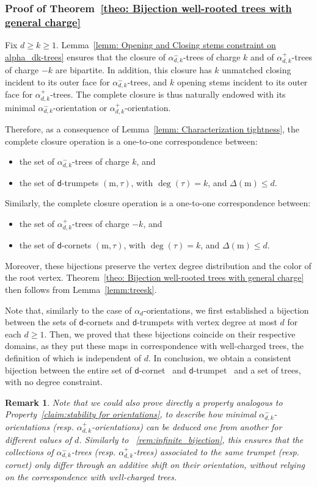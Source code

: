 \documentclass[11pt,reqno,tbtags]{amsart}
\renewcommand{\rm}{\mathrm{m}}
\newtheorem{rema}[theo]{Remark}
\numberwithin{equation}{section}
\numberwithin{theo}{section}
\theoremstyle{definition}
\newcommand{\dtrum}{$\mathsf{d}$-trumpet}
\newcommand{\dcorn}{$\mathsf{d}$-cornet}
\begin{document}
			
\subsubsection{Proof of Theorem~\ref{theo: Bijection well-rooted trees with general charge}}

Fix $d \geq k\geq 1$.
Lemma~\ref{lemm: Opening and Closing stems constraint on alpha_dk-trees} ensures that the closure of $\alpha_{d,k}^-$-trees of charge $k$ and of  $\alpha_{d,k}^+$-trees of charge $-k$  are bipartite. In addition, this closure has $k$ unmatched closing incident to its outer face for $\alpha_{d,k}^-$-trees, and $k$ opening stems incident to its outer face for $\alpha_{d,k}^+$-trees. The complete closure is thus naturally endowed with its minimal $\alpha_{d,k}^-$-orientation or $\alpha_{d,k}^+$-orientation. 


Therefore, as a consequence of Lemma~\ref{lemm: Characterization tightness}, the complete closure operation is a one-to-one correspondence between:
\begin{itemize}
\item the set of $\alpha_{d,k}^-$-trees of charge $k$, and
\item the set of \dtrum{s} $(\rm,\tau)$, with $\deg(\tau)=k$, and $\Delta(\rm)\leq d$.
\end{itemize}
Similarly, the complete closure operation is a one-to-one correspondence between:
\begin{itemize}
\item the set of $\alpha_{d,k}^+$-trees of charge $-k$, and
\item the set of \dcorn{s} $(\rm,\tau)$, with $\deg(\tau)=k$, and $\Delta(\rm)\leq d$.
\end{itemize}
Moreover, these bijections preserve the vertex degree distribution and the color of the root vertex. Theorem~\ref{theo: Bijection well-rooted trees with general charge} then follows from Lemma~\ref{lemm:treesk}.

Note that, similarly to the case of $\alpha_d$-orientations, we first established a bijection between the sets of \dcorn s and \dtrum s with vertex degree at most $d$  for each $d\geq 1$. Then, we proved that these bijections coincide on their respective domains, as they put these maps in correspondence with well-charged trees, the definition of which is independent of $d$. In conclusion, we obtain a consistent bijection between the entire set of \dcorn~ and \dtrum~ and a set of trees, with no degree constraint.

\begin{rema}
Note that we could also prove directly a property analogous to Property~\ref{claim:stability for orientations}, to describe how minimal $\alpha_{d,k}^-$-orientations (resp. $\alpha_{d,k}^+$-orientations) can be deduced one from another for different values of $d$. Similarly to ~\ref{rem:infinite_bijection}, this ensures that the collections of $\alpha_{d,k}^-$-trees (resp. $\alpha_{d,k}^+$-trees) associated to the same trumpet (resp. cornet) only differ through an additive shift on their orientation, without relying on the correspondence with well-charged trees.
\end{rema}
\end{document}
